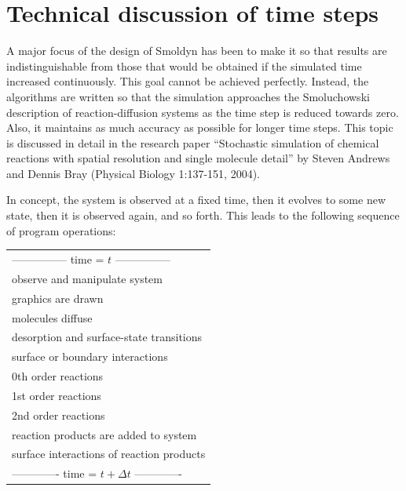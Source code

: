 \documentclass {scrbook}
\begin{document}
\section{Technical discussion of time steps}

A major focus of the design of Smoldyn has been to make it so that results are indistinguishable from those that would be obtained if the simulated time increased continuously. This goal cannot be achieved perfectly. Instead, the algorithms are written so that the simulation approaches the Smoluchowski description of reaction-diffusion systems as the time step is reduced towards zero. Also, it maintains as much accuracy as possible for longer time steps. This topic is discussed in detail in the research paper ``Stochastic simulation of chemical reactions with spatial resolution and single molecule detail'' by Steven Andrews and Dennis Bray (Physical Biology 1:137-151, 2004).

In concept, the system is observed at a fixed time, then it evolves to some new state, then it is observed again, and so forth. This leads to the following sequence of program operations:

\begin{longtable}[c]{l}
--------------- time = $t$ ---------------\\
observe and manipulate system\\
graphics are drawn\\
molecules diffuse\\
desorption and surface-state transitions\\
surface or boundary interactions\\
0th order reactions\\
1st order reactions\\
2nd order reactions\\
reaction products are added to system\\
surface interactions of reaction products\\
------------- time = $t + \Delta t$ -------------
\end{longtable}
\end{document}
